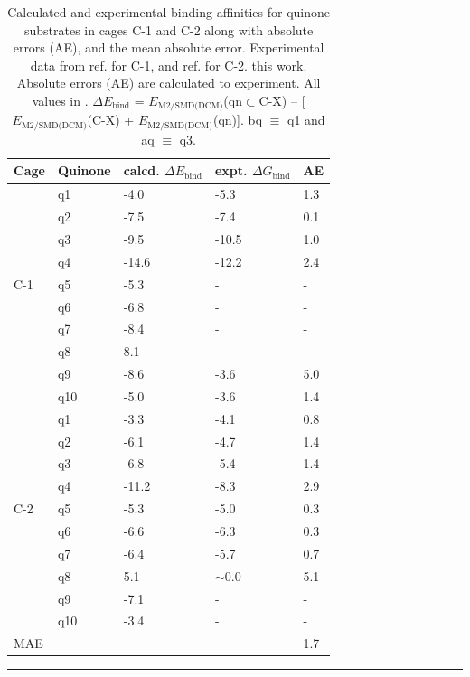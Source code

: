 \documentclass[../../main.tex]{subfiles}
\begin{document}
\begin{table}[h!]
	\def\arraystretch{1.7}
	\begin{tabularx}{\textwidth}{YYYYY}
		\hline	
		Cage&	Quinone	&calcd. $\Delta E_\text{bind}$	&expt.  $\Delta G_\text{bind}$&	AE \\
		\hline
		
		&q1	&-4.0&	-5.3&	1.3
\\
		&q2&	-7.5&	-7.4&	0.1
\\
		&q3&	-9.5&	-10.5&	1.0
\\
		&q4	&-14.6&	-12.2&	2.4
\\
	C-1 	&	q5&	-5.3&	-&	-
\\
 		&q6	&-6.8&	-&	-
\\
	&	q7	&-8.4&	-&	-
\\
	&	q8	&8.1&	-	&-
\\
	&	q9	&-8.6&	-3.6&	5.0
\\
		&q10&	-5.0&	-3.6	&1.4
\\
		
		&	q1&	-3.3&	-4.1&	0.8
\\
		&q2&	-6.1&	-4.7&	1.4
\\
		&	q3&	-6.8&	-5.4&	1.4
\\
		&	q4	&-11.2&-8.3	&2.9
\\
	C-2	&	q5&	-5.3&	-5.0&	0.3
\\
		&	q6	&-6.6&	-6.3&	0.3
\\
		&	q7	&-6.4&	-5.7&	0.7
\\
		&q8	&5.1	&    $\sim$0.0	&5.1
\\
		&	q9&	-7.1&	-&	-
\\
		&q10&	-3.4	&-	&-
\\
		MAE		&&&	&	1.7
\\

	\end{tabularx}
	\hrule
	\vspace{0.2cm}
	\caption{Calculated and experimental binding affinities for quinone substrates in cages C-1 and C-2 along with absolute errors (AE), and the mean absolute error. Experimental data from ref. \cite{August2016} for C-1, and ref. \cite{MartCentelles2018} for C-2. this work. Absolute errors (AE) are calculated to experiment. All values in \kcal. $\Delta E_\text{bind}$ = $E_\text{M2/SMD(DCM)}$(qn$\subset$C-X) – [$E_\text{M2/SMD(DCM)}$(C-X) + $E_\text{M2/SMD(DCM)}$(qn)]. bq $\equiv$ q1 and aq $\equiv$ q3.}
	\label{table::si_da_8}
\end{table}
\end{document}
